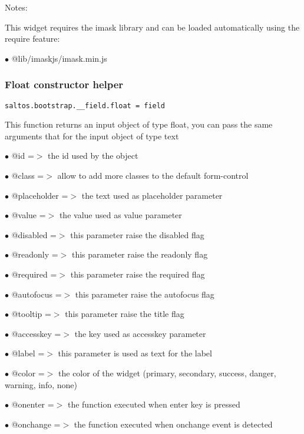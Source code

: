 \documentclass[a4paper]{article}
\begin{document}
Notes:

This widget requires the imask library and can be loaded automatically using the require
feature:

\begin{compactitem}
\item[\color{myblue}$\bullet$] @lib/imaskjs/imask.min.js
\end{compactitem}

\hypertarget{toc611}{}
\subsubsection{Float constructor helper}

\begin{lstlisting}
saltos.bootstrap.__field.float = field
\end{lstlisting}

This function returns an input object of type float, you can pass the same arguments
that for the input object of type text

\begin{compactitem}
\item[\color{myblue}$\bullet$] @id          =$>$ the id used by the object
\item[\color{myblue}$\bullet$] @class       =$>$ allow to add more classes to the default form-control
\item[\color{myblue}$\bullet$] @placeholder =$>$ the text used as placeholder parameter
\item[\color{myblue}$\bullet$] @value       =$>$ the value used as value parameter
\item[\color{myblue}$\bullet$] @disabled    =$>$ this parameter raise the disabled flag
\item[\color{myblue}$\bullet$] @readonly    =$>$ this parameter raise the readonly flag
\item[\color{myblue}$\bullet$] @required    =$>$ this parameter raise the required flag
\item[\color{myblue}$\bullet$] @autofocus   =$>$ this parameter raise the autofocus flag
\item[\color{myblue}$\bullet$] @tooltip     =$>$ this parameter raise the title flag
\item[\color{myblue}$\bullet$] @accesskey   =$>$ the key used as accesskey parameter
\item[\color{myblue}$\bullet$] @label       =$>$ this parameter is used as text for the label
\item[\color{myblue}$\bullet$] @color       =$>$ the color of the widget (primary, secondary, success, danger, warning, info, none)
\item[\color{myblue}$\bullet$] @onenter     =$>$ the function executed when enter key is pressed
\item[\color{myblue}$\bullet$] @onchange    =$>$ the function executed when onchange event is detected
\end{compactitem}
\end{document}
